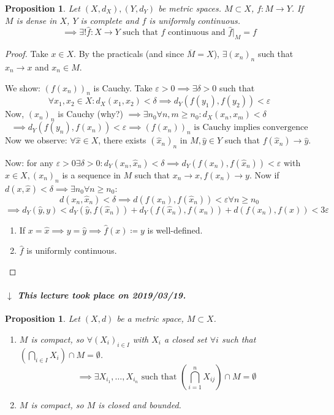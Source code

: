 \documentclass[a4paper]{article}
\newcounter{lecref}[section]
\numberwithin{lecref}{section}
\newtheorem{proposition}[lecref]{Proposition}
\newcommand{\dateref}[1]{%
  \begin{mdframed}[backgroundcolor=gray!10,innerbottommargin=0pt,innertopmargin=0pt]
    \paragraph{\textit{$\downarrow$ This lecture took place on #1.}}%
  \end{mdframed}%
}
\begin{document}
\begin{proposition}
	\label{proposition:1.17}
	Let $(X, d_X), (Y, d_Y)$ be metric spaces. $M \subset X$, $f: M \to Y$.
	If $M$ is dense in $X$, $Y$ is complete and $f$ is uniformly continuous.
	\[ \implies \exists! \hat f: X \to Y \text{ such that } \hat f \text{ continuous and } \hat f |_M = f \]
\end{proposition}

\begin{proof}
	Take $x \in X$. By the practicals (and since $\overline M = X$), $\exists (x_n)_n$ such that $x_n \to x$ and $x_n \in M$.

	We show: $(f(x_n))_n$ is Cauchy. Take $\varepsilon > 0 \implies \exists \delta > 0$ such that
	\[ \forall x_1, x_2 \in X: d_X(x_1, x_2) < \delta \implies d_Y(f(y_1), f(y_2)) < \varepsilon \]
	Now, $(x_n)_n$ is Cauchy (why?) $\implies \exists n_0 \forall n, m \geq n_0: d_X(x_n, x_m) < \delta$
	\[ \implies d_Y(f(y_n), f(x_n)) < \varepsilon \implies (f(x_n))_n \text{ is Cauchy implies convergence} \]
	Now we observe: $\forall \hat x \in X$, there exists $(\hat x_n)_n$ in $M, \hat y \in Y$ such that $f(\hat x_n) \to \hat y$.

	Now: for any $\varepsilon > 0 \exists \delta > 0: d_Y(x_n, \hat x_n) < \delta \implies d_Y(f(x_n), f(\hat x_n)) < \varepsilon$
	with $x \in X, (x_n)_n$ is a sequence in $M$ such that $x_n \to x, f(x_n) \to y$.
	Now if $d(x, \hat x) < \delta \implies \exists n_0 \forall n \geq n_0$:
	\[ d(x_n, \hat x_n) < \delta \implies d(f(x_n), f(\hat x_n)) < \varepsilon \forall n \geq n_0 \]
	\[ \implies d_Y(\hat y, y) < d_Y(\hat y, f(\hat x_n)) + d_Y(f(\hat x_n), f(x_n)) + d(f(x_n), f(x)) < 3 \varepsilon \]
	\begin{enumerate}
		\item If $x = \hat x \implies y = \hat y \implies \hat f(x) \coloneqq y$ is well-defined.
		\item $\hat f$ is uniformly continuous.
	\end{enumerate}
\end{proof}

\dateref{2019/03/19}

\begin{proposition}
	\label{prop:1.18}
	Let $(X, d)$ be a metric space, $M \subset X$.  %
	\begin{enumerate}
		\item $M$ is compact, so $\forall (X_i)_{i \in I}$ with $X_i$ a closed set $\forall i$ such that $\left(\bigcap_{i \in I} X_i\right) \cap M = \emptyset$.
			\[ \implies \exists X_{i_1}, \dots, X_{i_n} \text{ such that } \left(\bigcap_{i=1}^n X_{ij}\right) \cap M = \emptyset \]
		\item $M$ is compact, so $M$ is closed and bounded.
	\end{enumerate}
\end{proposition}
\end{document}
